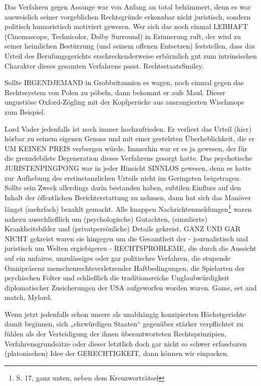 \begin{multicols}{2}
Das Verfahren gegen Assange war von Anfang an total
behämmert, denn es war ausweislich seiner vorgeblichen Rechtsgründe erkennbar nicht juristisch, sondern
politisch humoristisch motiviert gewesen. Wer sich das
noch einmal LEBHAFT (Cinemascope, Technicolor,
Dolby Surround) in Erinnerung ruft, der wird zu seiner
heimlichen Bestürzung (und seinem offenen Entsetzen) feststellen, dass das Urteil des Berufungsgerichts
erschreckenderweise erbärmlich gut zum intrinsischen
Charakter dieses gesamten Verfahrens passt. RechtsstaatsSmiley.

Sollte IRGENDJEMAND in Grobbritannien es wagen,
noch einmal gegen das Rechtssystem von Polen zu pöbeln, dann bekommt er aufs Maul. Dieser ungustiöse
Oxford-Zögling mit der Kopfperücke aus ausrangierten
Wischmops zum Beispiel.

Lord Vader jedenfalls ist noch immer hochzufrieden. Er
verliest das Urteil (hier) hörbar zu seinem eigenen Genuss und mit einer gestelzten Überheblichkeit, die er
UM KEINEN PREIS verbergen würde. Immerhin war er
es ja gewesen, der für die grenzdebilste Degeneration
dieses Verfahrens gesorgt hatte. Das psychotische JURISTENPINGPONG war in jeder Hinsicht SINNLOS gewesen, denn es hatte zur Aufhebung des erstinstanzlichen Urteils nicht im Geringsten beigetragen. Sollte sein
Zweck allerdings darin bestanden haben, subtilen Einfluss auf den Inhalt der öffentlichen Berichterstattung
zu nehmen, dann hat sich das Manöver längst (mehrfach) bezahlt gemacht. Alle knappen Nachrichtenmeldungen\footnote[34]{S. 17, ganz unten, neben dem Kreuzworträtsel} waren nahezu ausschließlich um (psychologische) Gutachten, (simulierte) Krankheitsbilder und
(privatpersönliche) Details gekreist. GANZ UND GAR
NICHT gekreist waren sie hingegen um die Gesamtheit
der - journalistisch und juristisch um Welten ergiebigeren - RECHTSPROBLEME, die durch die Aussicht auf ein
unfaires, unzulässiges oder gar politisches Verfahren, die
stupende Omnipräsenz menschenrechtsverletzender
Haftbedingungen, die Spielarten der psychischen Folter
und schließlich die traditionsreiche Unglaubwürdigkeit
diplomatischer Zusicherungen der USA aufgeworfen
worden waren. Game, set and match, Mylord.

Wenn jetzt jedenfalls schon unsere als unabhängig konzipierten Höchstgerichte damit beginnen, sich „ehrwürdigen Staaten“ gegenüber stärker verpflichtet zu fühlen
als der Verteidigung der ihnen überantworteten Rechtsprinzipien, Verfahrensgrundsätze oder dieser letztlich
doch gar nicht so schwer erfassbaren (platonischen)
Idee der GERECHTIGKEIT, dann können wir einpacken.


\end{multicols}
